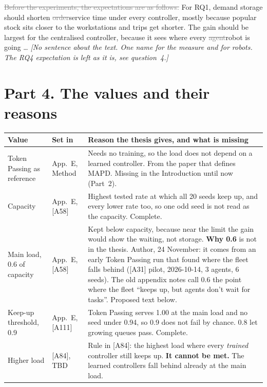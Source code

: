 \documentclass[11pt,a4paper]{article}
\newcommand{\new}[1]{\textcolor{newc}{#1}}
\newcommand{\old}[1]{\textcolor{gray}{\sout{#1}}}
\newcommand{\note}[1]{{\small\itshape [#1]}}
\begin{document}
\old{Before the experiments, the expectations are as follows.} For RQ1,
demand storage should shorten \old{order}\new{service} time under every
controller, mostly because popular stock sits closer to the workstations and
trips get shorter. The gain should be largest for the centralised
controller, because it sees where every \old{agent}\new{robot} is going
\ldots
\note{No sentence about the text. One name for the measure and for robots.
The RQ4 expectation is left as it is, see question~4.}

\section*{Part 4. The values and their reasons}

\begin{tabularx}{\linewidth}{@{}p{2.6cm}p{2.2cm}X@{}}
\toprule
Value & Set in & Reason the thesis gives, and what is missing \\
\midrule
Token Passing as reference & App.~E, Method & Needs no training, so the
load does not depend on a learned controller. From the paper that defines
MAPD. Missing in the Introduction until now (Part~2). \\
Capacity & App.~E, [A58] & Highest tested rate at which all 20 seeds keep
up, and every lower rate too, so one odd seed is not read as the capacity.
Complete. \\
Main load, 0.6 of capacity & App.~E, [A58] & Kept below capacity, because
near the limit the gain would show the waiting, not storage. \textbf{Why 0.6}
is not in the thesis. Author, 24 November: it comes from an early Token
Passing run that found where the fleet falls behind ([A31] pilot, 2026-10-14,
3 agents, 6 seeds). The old appendix notes call 0.6 the point where the fleet
``keeps up, but agents don't wait for tasks''. Proposed text below. \\
Keep-up threshold, 0.9 & App.~E, [A111] & Token Passing serves 1.00 at the
main load and no seed under 0.94, so 0.9 does not fail by chance. 0.8 let
growing queues pass. Complete. \\
Higher load & [A84], TBD & Rule in [A84]: the highest load where every
\emph{trained} controller still keeps up. \textbf{It cannot be met.} The
learned controllers fall behind already at the main load. \\
\bottomrule
\end{tabularx}

\end{document}
